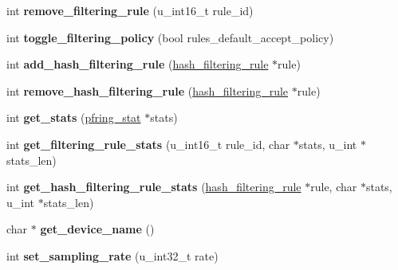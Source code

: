 \begin{DoxyCompactItemize}
\item 
\hypertarget{class_p_fring_ac8747e59479cf586796d657adacf97db}{
int {\bfseries remove\_\-filtering\_\-rule} (u\_\-int16\_\-t rule\_\-id)}
\label{class_p_fring_ac8747e59479cf586796d657adacf97db}

\item 
\hypertarget{class_p_fring_a3b675c477f8165a4b1bf47cae678387b}{
int {\bfseries toggle\_\-filtering\_\-policy} (bool rules\_\-default\_\-accept\_\-policy)}
\label{class_p_fring_a3b675c477f8165a4b1bf47cae678387b}

\item 
\hypertarget{class_p_fring_a840f70ba2fac623e84dcfce34e195b42}{
int {\bfseries add\_\-hash\_\-filtering\_\-rule} (\hyperlink{structhash__filtering__rule}{hash\_\-filtering\_\-rule} $\ast$rule)}
\label{class_p_fring_a840f70ba2fac623e84dcfce34e195b42}

\item 
\hypertarget{class_p_fring_a520b47d4a5c249c92dd0ebce83f571b0}{
int {\bfseries remove\_\-hash\_\-filtering\_\-rule} (\hyperlink{structhash__filtering__rule}{hash\_\-filtering\_\-rule} $\ast$rule)}
\label{class_p_fring_a520b47d4a5c249c92dd0ebce83f571b0}

\item 
\hypertarget{class_p_fring_ace5c0e5ce44bd1935bc939bf2bcab107}{
int {\bfseries get\_\-stats} (\hyperlink{structpfring__stat}{pfring\_\-stat} $\ast$stats)}
\label{class_p_fring_ace5c0e5ce44bd1935bc939bf2bcab107}

\item 
\hypertarget{class_p_fring_a3cb0d023349aa2d986fa7dbb30feaa8b}{
int {\bfseries get\_\-filtering\_\-rule\_\-stats} (u\_\-int16\_\-t rule\_\-id, char $\ast$stats, u\_\-int $\ast$stats\_\-len)}
\label{class_p_fring_a3cb0d023349aa2d986fa7dbb30feaa8b}

\item 
\hypertarget{class_p_fring_a09a222fcd4d5599e235f8d402de4211b}{
int {\bfseries get\_\-hash\_\-filtering\_\-rule\_\-stats} (\hyperlink{structhash__filtering__rule}{hash\_\-filtering\_\-rule} $\ast$rule, char $\ast$stats, u\_\-int $\ast$stats\_\-len)}
\label{class_p_fring_a09a222fcd4d5599e235f8d402de4211b}

\item 
\hypertarget{class_p_fring_a752f4928dc313192d0783a021cf1c197}{
char $\ast$ {\bfseries get\_\-device\_\-name} ()}
\label{class_p_fring_a752f4928dc313192d0783a021cf1c197}

\item 
\hypertarget{class_p_fring_aa54a7905312538c49b1bff77f4d55023}{
int {\bfseries set\_\-sampling\_\-rate} (u\_\-int32\_\-t rate)}
\label{class_p_fring_aa54a7905312538c49b1bff77f4d55023}


\end{DoxyCompactItemize}
